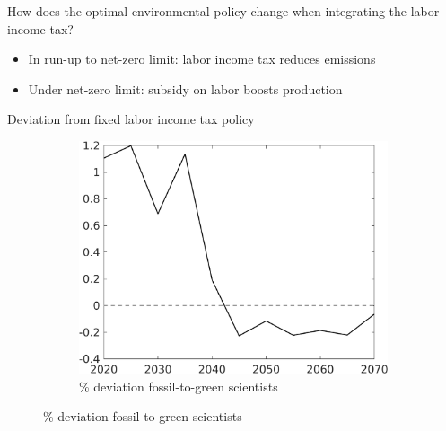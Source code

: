 \documentclass[11pt,aspectratio=169]{beamer}
\begin{document}
\begin{frame}{How does the optimal environmental policy change when integrating the labor income tax?}
\begin{figure}[h!!]
\begin{subfigure}{0.4\textwidth}
		\end{subfigure}
	\end{figure}
	\vspace{3mm}
	\begin{block}{}
		\begin{itemize}
			\item In run-up to net-zero limit: labor income tax reduces emissions
			\item Under net-zero limit: subsidy on labor boosts production
		\end{itemize}
	\end{block}	
\end{frame}
\begin{frame}{Deviation from fixed labor income tax policy}
\hypertarget{mec0}{}
\vspace{-3mm}
\pause
\centering
\begin{figure}
	\begin{subfigure}{0.4\textwidth}
		\caption{{\% deviation fossil-to-green scientists }}
		\includegraphics[width=1\textwidth]{../codding_model/own_basedOnFried/optimalPol_010922_revision/figures/all_13Sept22/NewCalib_polTaulFixedPer_T_sffsg_Sun2_emnet1_spillover0_knspil3_xgr0_nsk0_sep0_extern0_PV1_etaa0.79.png}

\end{subfigure}
\end{figure}
\end{frame}
\end{document}
